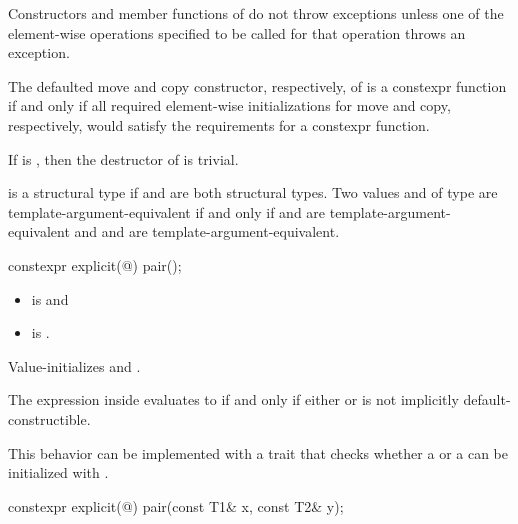 \pnum
Constructors and member functions of  do not throw exceptions unless one of
the element-wise operations specified to be called for that operation
throws an exception.

\pnum
The defaulted move and copy constructor, respectively, of 
is a constexpr function if and only if all required element-wise
initializations for move and copy, respectively, would satisfy the
requirements for a constexpr function.

\pnum
If 
is , then the destructor of  is trivial.

\pnum
{} is a structural type
if  and  are both structural types.
Two values  and  of type 
are template-argument-equivalent if and only if
 and  are template-argument-equivalent and
 and  are template-argument-equivalent.

%
\begin{itemdecl}
constexpr explicit(@\seebelow@) pair();
\end{itemdecl}

\begin{itemdescr}
\pnum
\constraints
\begin{itemize}
\item {} is  and
\item {} is .
\end{itemize}

\pnum
\effects
Value-initializes  and .

\pnum
\remarks
The expression inside  evaluates to 
if and only if either  or
 is not implicitly default-constructible.
\begin{note}
This behavior can be implemented with a trait that checks
whether a  or a 
can be initialized with \tcode{\{\}}.
\end{note}
\end{itemdescr}

%
\begin{itemdecl}
constexpr explicit(@\seebelow@) pair(const T1& x, const T2& y);
\end{itemdecl}

